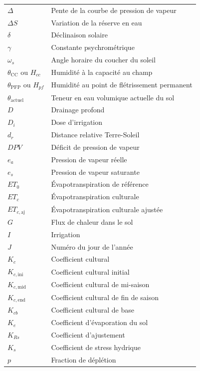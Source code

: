 \begin{longtable}{p{3.5cm}p{11cm}}
    $\Delta$ & Pente de la courbe de pression de vapeur \\
    $\Delta S$ & Variation de la réserve en eau \\
    $\delta$ & Déclinaison solaire \\
    $\gamma$ & Constante psychrométrique \\
    $\omega_s$ & Angle horaire du coucher du soleil \\
    $\theta_{\mathrm{CC}}$ ou $H_{cc}$ & Humidité à la capacité au champ \\
    $\theta_{\mathrm{PFP}}$ ou $H_{pf}$ & Humidité au point de flétrissement permanent \\
    $\theta_{\text{actuel}}$ & Teneur en eau volumique actuelle du sol \\
    $D$ & Drainage profond \\
    $D_i$ & Dose d'irrigation \\
    $d_r$ & Distance relative Terre-Soleil \\
    $DPV$ & Déficit de pression de vapeur \\
    $e_a$ & Pression de vapeur réelle \\
    $e_s$ & Pression de vapeur saturante \\
    $ET_0$ & Évapotranspiration de référence \\
    $ET_c$ & Évapotranspiration culturale \\
    $ET_{c,\mathrm{aj}}$ & Évapotranspiration culturale ajustée \\
    $G$ & Flux de chaleur dans le sol \\
    $I$ & Irrigation \\
    $J$ & Numéro du jour de l'année \\
    $K_c$ & Coefficient cultural \\
    $K_{c,\mathrm{ini}}$ & Coefficient cultural initial \\
    $K_{c,\mathrm{mid}}$ & Coefficient cultural de mi-saison \\
    $K_{c,\mathrm{end}}$ & Coefficient cultural de fin de saison \\
    $K_{cb}$ & Coefficient cultural de base \\
    $K_e$ & Coefficient d'évaporation du sol \\
    $K_{Rs}$ & Coefficient d'ajustement \\
    $K_s$ & Coefficient de stress hydrique \\
    $p$ & Fraction de déplétion \\

\end{longtable}

